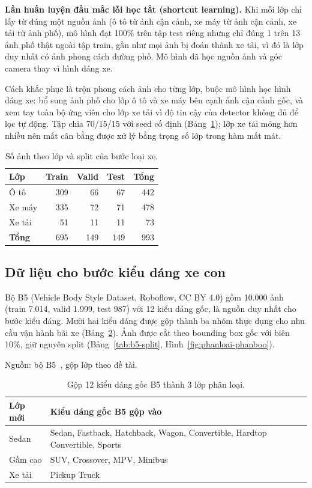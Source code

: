 \textbf{Lần huấn luyện đầu mắc lỗi học tắt (shortcut learning).} Khi mỗi lớp chỉ lấy từ đúng
một nguồn ảnh (ô tô từ ảnh cận cảnh, xe máy từ ảnh cận cảnh, xe tải từ ảnh phố), mô hình đạt
100\% trên tập test riêng nhưng chỉ đúng 1 trên 13 ảnh phố thật ngoài tập train, gần như mọi
ảnh bị đoán thành xe tải, vì đó là lớp duy nhất có ảnh phong cách đường phố. Mô hình đã học
nguồn ảnh và góc camera thay vì hình dáng xe.

Cách khắc phục là trộn phong cách ảnh cho từng lớp, buộc mô hình học hình dáng xe: bổ sung
ảnh phố cho lớp ô tô và xe máy bên cạnh ảnh cận cảnh gốc, và xem tay toàn bộ ứng viên cho lớp
xe tải vì độ tin cậy của detector không đủ để lọc tự động. Tập chia 70/15/15 với seed cố định
(Bảng~\ref{tab:vt-split}); lớp xe tải mỏng hơn nhiều nên mất cân bằng được xử lý bằng trọng
số lớp trong hàm mất mát.

\begin{table}[htbp]
\centering
\caption{Số ảnh theo lớp và split của bước loại xe.}
\label{tab:vt-split}

\begin{tabular}{lrrrr}
\toprule
\textbf{Lớp} & \textbf{Train} & \textbf{Valid} & \textbf{Test} & \textbf{Tổng} \\
\midrule
Ô tô & 309 & 66 & 67 & 442 \\
Xe máy & 335 & 72 & 71 & 478 \\
Xe tải & 51 & 11 & 11 & 73 \\
\midrule
\textbf{Tổng} & 695 & 149 & 149 & 993 \\
\bottomrule
\end{tabular}
\end{table}

\subsection{Dữ liệu cho bước kiểu dáng xe con}

Bộ B5 (Vehicle Body Style Dataset, Roboflow, CC BY 4.0) gồm 10.000 ảnh (train 7.014, valid
1.999, test 987) với 12 kiểu dáng gốc, là nguồn duy nhất cho bước kiểu dáng. Mười hai kiểu
dáng được gộp thành ba nhóm thực dụng cho nhu cầu vận hành bãi xe (Bảng~\ref{tab:b5-mapping}).
Ảnh được cắt theo bounding box gốc với biên 10\%, giữ nguyên split
(Bảng~\ref{tab:b5-split}, Hình~\ref{fig:phanloai-phanboo}).

\begin{table}[htbp]
\centering
\caption{Gộp 12 kiểu dáng gốc B5 thành 3 lớp phân loại.}
\label{tab:b5-mapping}
{\footnotesize Nguồn: bộ B5~\autocite{researchprojects2022vehiclebodystyle}, gộp lớp theo đề tài.}
\begin{tabular}{ll}
\toprule
\textbf{Lớp mới} & \textbf{Kiểu dáng gốc B5 gộp vào} \\
\midrule
Sedan & Sedan, Fastback, Hatchback, Wagon, Convertible, Hardtop Convertible, Sports \\
Gầm cao & SUV, Crossover, MPV, Minibus \\
Xe tải & Pickup Truck \\
\bottomrule
\end{tabular}
\end{table}

